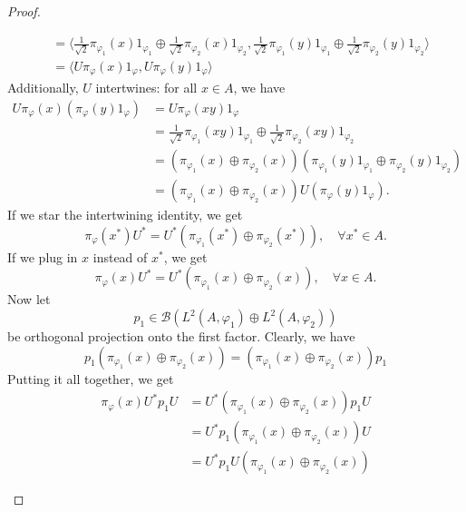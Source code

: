 \documentclass[10pt, a4paper]{article}
\newenvironment{noticeC}{%
  \tcolorbox[%
  notitle,
  empty,
  enhanced,  %
  breakable,
  coltext=black, 
  fontupper=\rmfamily,
  noparskip,
  sharp corners,
  boxrule=-1pt,  %
  frame hidden,
  left=7pt,  %
  right=7pt,
  top=5pt,
  bottom=5pt,
  before skip=2.5ex plus 2pt,
  after skip=2.5ex plus 2pt,
  overlay unbroken and last={%
  },
  ]}
{\endtcolorbox}
\newenvironment{myproof}%
  {\begin{noticeC}\begin{proof}}%
  {\end{proof}\end{noticeC}}
\begin{document}
\begin{myproof}
\begin{itemize}
\begin{align*}
      &= \langle \frac{1}{\sqrt{2}} \pi_{\varphi_1} (x) 1_{\varphi_1} \oplus \frac{1}{\sqrt{2}} \pi_{\varphi_2} (x) 1_{\varphi_2}, \frac{1}{\sqrt{2}} \pi_{\varphi_1} (y) 1_{\varphi_1} \oplus \frac{1}{\sqrt{2}} \pi_{\varphi_2} (y) 1_{\varphi_2} \rangle\\
      &= \langle U \pi_\varphi (x) 1_\varphi, U \pi_\varphi (y) 1_\varphi \rangle
    \end{align*}
    Additionally, $U$ intertwines: for all $x \in A$, we have
    \begin{align*}
      U \pi_{\varphi}(x) (\pi_{\varphi} (y) 1_{\varphi}) &= U \pi_{\varphi} (xy) 1_{\varphi}\\
      &= \frac{1}{\sqrt{2}} \pi_{\varphi_1} (xy) 1_{\varphi_1} \oplus \frac{1}{\sqrt{2}} \pi_{\varphi_2} (xy) 1_{\varphi_2}\\
      &= \left(\pi_{\varphi_1} (x) \oplus \pi_{\varphi_2} (x)\right) (\pi_{\varphi_1} (y) 1_{\varphi_1} \oplus \pi_{\varphi_2} (y) 1_{\varphi_2})\\
      &= \left(\pi_{\varphi_1} (x) \oplus \pi_{\varphi_2} (x)\right) U (\pi_{\varphi} (y) 1_{\varphi}).
    \end{align*}
    If we star the intertwining identity, we get 
    \begin{equation*}
      \pi_{\varphi}(x^*) U^* = U^* \left(\pi_{\varphi_1} (x^*) \oplus \pi_{\varphi_2} (x^*)\right),\quad \forall x^* \in A.
    \end{equation*}
    If we plug in $x$ instead of $x^*$, we get 
    \begin{equation*}
      \pi_{\varphi}(x) U^* = U^* \left(\pi_{\varphi_1} (x) \oplus \pi_{\varphi_2} (x)\right),\quad \forall x \in A.
    \end{equation*}
    Now let $$p_1 \in \mathcal{B} (L^2 (A, \varphi_1) \oplus L^2 (A, \varphi_2))$$
    be orthogonal projection onto the first factor.
    Clearly, we have
    \begin{equation*}
      p_1 \left(\pi_{\varphi_1} (x) \oplus \pi_{\varphi_2} (x)\right) = \left(\pi_{\varphi_1} (x) \oplus \pi_{\varphi_2} (x)\right) p_1 
    \end{equation*}
    Putting it all together, we get 
    \begin{align*}
      \pi_{\varphi} (x) U^* p_1 U &= U^* (\pi_{\varphi_1} (x) \oplus \pi_{\varphi_2} (x)) p_1 U\\
      &= U^* p_1 (\pi_{\varphi_1} (x) \oplus \pi_{\varphi_2} (x)) U\\
      &= U^* p_1 U (\pi_{\varphi_1} (x) \oplus \pi_{\varphi_2} (x))

\end{align*}
\end{itemize}
\end{myproof}
\end{document}
